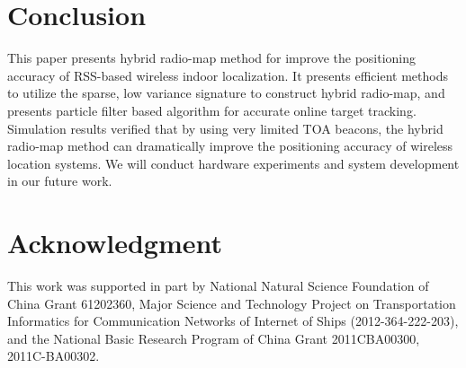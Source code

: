 \documentclass[conference, 10pt]{IEEEtran}
\begin{document}
\section{Conclusion}
This paper presents hybrid radio-map method for improve the positioning accuracy of RSS-based wireless indoor localization. It presents efficient methods to utilize the sparse, low variance signature to construct hybrid radio-map, and presents particle filter  based algorithm for accurate online target tracking. Simulation results verified that by using very limited TOA beacons, the hybrid radio-map method can dramatically improve the positioning accuracy of wireless location systems. We will conduct hardware experiments and system development in our future work. 



\section*{Acknowledgment}
This work was supported in part by National Natural
Science Foundation of China Grant 61202360, Major Science and Technology Project on Transportation Informatics for  Communication Networks of Internet of Ships (2012-364-222-203), and the National Basic Research Program of China Grant 2011CBA00300,
2011C-BA00302. 











\end{document}

